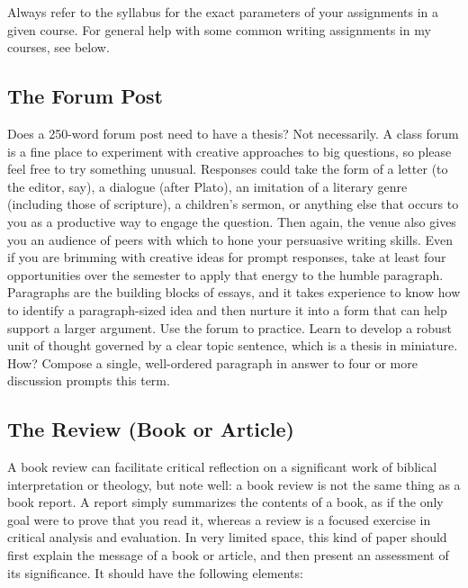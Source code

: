 \documentclass[11pt,twocolumn]{article}
\begin{document}
Always refer to the syllabus for the exact parameters of your
assignments in a given course. For general help with some common writing
assignments in my courses, see below.

\subsection{The Forum Post}

Does a 250-word forum post need to have a thesis? Not necessarily. A
class forum is a fine place to experiment with creative approaches to
big questions, so please feel free to try something unusual. Responses
could take the form of a letter (to the editor, say), a dialogue (after
Plato), an imitation of a literary genre (including those of scripture),
a children's sermon, or anything else that occurs to you as a productive
way to engage the question. Then again, the venue also gives you an
audience of peers with which to hone your persuasive writing skills.
Even if you are brimming with creative ideas for prompt responses, take
at least four opportunities over the semester to apply that energy to
the humble paragraph. Paragraphs are the building blocks of essays, and
it takes experience to know how to identify a paragraph-sized idea and
then nurture it into a form that can help support a larger argument. Use
the forum to practice. Learn to develop a robust unit of thought
governed by a clear topic sentence, which is a thesis in miniature. How?
Compose a single, well-ordered paragraph in answer to four or more
discussion prompts this term.

\subsection{The Review (Book or Article)}

A book review can facilitate critical reflection on a significant work
of biblical interpretation or theology, but note well: a book review is
not the same thing as a book report. A report simply summarizes the
contents of a book, as if the only goal were to prove that you read it,
whereas a review is a focused exercise in critical analysis and
evaluation. In very limited space, this kind of paper should first
explain the message of a book or article, and then present an assessment
of its significance. It should have the following elements:
\end{document}
